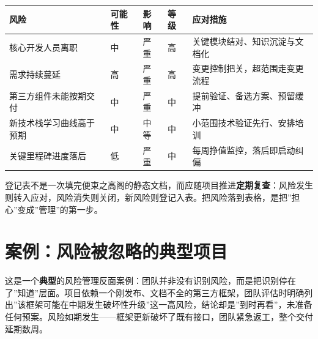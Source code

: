 \documentclass[
]{ctexbook}
\newcounter{none}
\begin{document}
{\def\LTcaptype{none} %
\begin{longtable}[]{@{}
  >{\raggedright\arraybackslash}p{}
  >{\raggedright\arraybackslash}p{}
  >{\raggedright\arraybackslash}p{}
  >{\raggedright\arraybackslash}p{}
  >{\raggedright\arraybackslash}p{}@{}}
\toprule\noalign{}
\begin{minipage}[b]{\linewidth}\raggedright
风险
\end{minipage} & \begin{minipage}[b]{\linewidth}\raggedright
可能性
\end{minipage} & \begin{minipage}[b]{\linewidth}\raggedright
影响
\end{minipage} & \begin{minipage}[b]{\linewidth}\raggedright
等级
\end{minipage} & \begin{minipage}[b]{\linewidth}\raggedright
应对措施
\end{minipage} \\
\midrule\noalign{}
\endhead
\bottomrule\noalign{}
\endlastfoot
核心开发人员离职 & 中 & 严重 & 高 & 关键模块结对、知识沉淀与文档化 \\
需求持续蔓延 & 高 & 严重 & 高 & 变更控制把关，超范围走变更流程 \\
第三方组件未能按期交付 & 中 & 严重 & 中 &
提前验证、备选方案、预留缓冲 \\
新技术栈学习曲线高于预期 & 中 & 中等 & 中 &
小范围技术验证先行、安排培训 \\
关键里程碑进度落后 & 低 & 严重 & 中 & 每周挣值监控，落后即启动纠偏 \\
\end{longtable}
}

登记表不是一次填完便束之高阁的静态文档，而应随项目推进\textbf{定期复查}：风险发生则转入应对，风险消失则关闭，新风险则登记入表。把风险落到表格，是把''担心''变成''管理''的第一步。

\section{案例：风险被忽略的典型项目}\label{ux6848ux4f8bux98ceux9669ux88abux5ffdux7565ux7684ux5178ux578bux9879ux76ee}

这是一个\textbf{典型}的风险管理反面案例：团队并非没有识别风险，而是把识别停在了''知道''层面。项目依赖一个刚发布、文档不全的第三方框架，团队评估时明确列出''该框架可能在中期发生破坏性升级''这一高风险，结论却是''到时再看''，未准备任何预案。风险如期发生------框架更新破坏了既有接口，团队紧急返工，整个交付延期数周。
\end{document}
